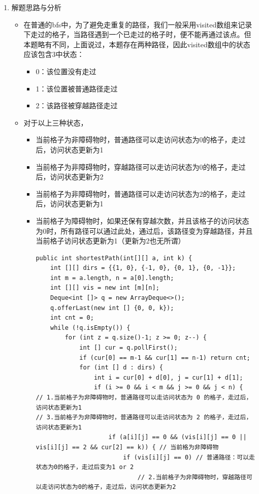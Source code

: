 \documentclass[9pt, b5paaper]{book}
\begin{document}
\begin{enumerate}
\item 解题思路与分析
\label{sec-1-8-1-1}
\begin{itemize}
\item 在普通的bfs中，为了避免走重复的路径，我们一般采用visited数组来记录下走过的格子，当路径遇到一个已走过的格子时，便不能再通过该点。但本题略有不同，上面说过，本题存在两种路径，因此visited数组中的状态应该包含3中状态：
\begin{itemize}
\item 0：该位置没有走过
\item 1：该位置被普通路径走过
\item 2：该路径被穿越路径走过
\end{itemize}
\item 对于以上三种状态，
\begin{itemize}
\item 当前格子为非障碍物时，普通路径可以走访问状态为0的格子，走过后，访问状态更新为1
\item 当前格子为非障碍物时，穿越路径可以走访问状态为0的格子，走过后，访问状态更新为2
\item 当前格子为非障碍物时，普通路径可以走访问状态为2的格子，走过后，访问状态更新为1
\item 当前格子为障碍物时，如果还保有穿越次数，并且该格子的访问状态为0时，所有路径可以通过此处，通过后，该路径变为穿越路径，并且当前格子访问状态更新为1（更新为2也无所谓）
\begin{verbatim}
public int shortestPath(int[][] a, int k) {
    int [][] dirs = {{1, 0}, {-1, 0}, {0, 1}, {0, -1}};
    int m = a.length, n = a[0].length;
    int [][] vis = new int [m][n]; 
    Deque<int []> q = new ArrayDeque<>();
    q.offerLast(new int [] {0, 0, k});
    int cnt = 0;
    while (!q.isEmpty()) {
        for (int z = q.size()-1; z >= 0; z--) {
            int [] cur = q.pollFirst();
            if (cur[0] == m-1 && cur[1] == n-1) return cnt;
            for (int [] d : dirs) {
                int i = cur[0] + d[0], j = cur[1] + d[1];
                if (i >= 0 && i < m && j >= 0 && j < n) {
// 1.当前格子为非障碍物时，普通路径可以走访问状态为 0 的格子，走过后，访问状态更新为1
// 3.当前格子为非障碍物时，普通路径可以走访问状态为 2 的格子，走过后，访问状态更新为1
                    if (a[i][j] == 0 && (vis[i][j] == 0 || vis[i][j] == 2 && cur[2] == k)) { // 当前格为非障碍物
                        if (vis[i][j] == 0) // 普通路径：可以走状态为0的格子，走过后变为1 or 2
                            // 2.当前格子为非障碍物时，穿越路径可以走访问状态为0的格子，走过后，访问状态更新为2 

\end{verbatim}
\end{itemize}
\end{itemize}
\end{enumerate}
\end{document}

